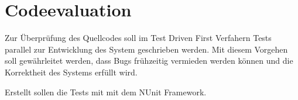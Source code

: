 \section{Codeevaluation}

Zur Überprüfung des Quellcodes soll im Test Driven First Verfahern Tests parallel zur Entwicklung des System geschrieben werden. Mit diesem Vorgehen soll gewährleitet werden, dass Bugs frühzeitig vermieden werden können und die Korrektheit des Systems erfüllt wird. 

Erstellt sollen die Tests mit mit dem NUnit Framework.